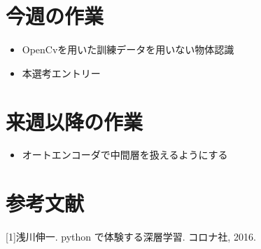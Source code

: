 \section{今週の作業}
\begin{itemize}
        \item OpenCvを用いた訓練データを用いない物体認識
        \item 本選考エントリー
\end{itemize}

\section{来週以降の作業}
\begin{itemize}
         \item オートエンコーダで中間層を扱えるようにする
\end{itemize}

\section{参考文献}
[1]浅川伸一. python で体験する深層学習. コロナ社, 2016.




